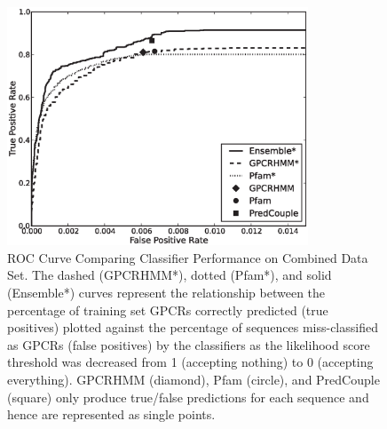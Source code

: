 \begin{figure}[H]
\centering
\includegraphics[width=0.8\textwidth]{figures/gpcr_classifier/combined_ensembl_roc.eps}
\caption{ROC Curve Comparing Classifier Performance on Combined Data Set. The dashed (GPCRHMM*), dotted (Pfam*), and solid (Ensemble*) curves represent the relationship between the percentage of training set GPCRs correctly predicted (true positives) plotted against the percentage of sequences miss-classified as GPCRs (false positives) by the classifiers as the likelihood score threshold was decreased from 1 (accepting nothing) to 0 (accepting everything). GPCRHMM (diamond), Pfam (circle), and PredCouple (square) only produce true/false predictions for each sequence and hence are represented as single points. }
\label{fig:combined-roc-curve}
\end{figure}

